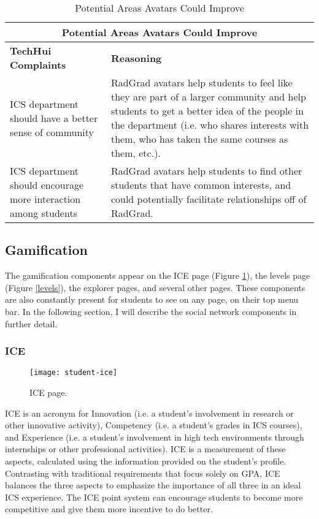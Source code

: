 \begin{table}[htbp!]
\centering
\begin{tabular}{  |p{4cm}|p{12cm}| } 
\hline
 \multicolumn{2}{|c|}{Potential Areas Avatars Could Improve}\\
  \hline
 \textbf{TechHui Complaints} & \textbf{Reasoning} \\ 
  \hline
ICS department should have a better sense of community & RadGrad avatars help students to feel like they are part of a larger community and help students to get a better idea of the people in the department (i.e. who shares interests with them, who has taken the same courses as them, etc.). \\
\hline
ICS department should encourage more interaction among students & RadGrad avatars help students to find other students that have common interests, and could potentially facilitate relationships off of RadGrad.\\
\hline
\end{tabular}
 \caption{Potential Areas Avatars Could Improve}
\end{table}


\subsection{Gamification}

The gamification components appear on the ICE page (Figure \ref{ice}), the levels page (Figure \ref{levels}), the explorer pages, and several other pages. These components are also constantly present for students to see on any page, on their top menu bar. In the following section, I will describe the social network components in further detail. 
\subsubsection{ICE}
\begin{figure}[htbp!]
\centering
\texttt{[image: student-ice]}
\caption{ICE page.}
\label{ice}
\end{figure}
ICE is an acronym for Innovation (i.e. a student's involvement in research or other innovative activity), Competency (i.e. a student's grades in ICS courses), and Experience (i.e. a student's involvement in high tech environments through internships or other professional activities). ICE is a measurement of these aspects, calculated using the information provided on the student's profile. Contrasting with traditional requirements that focus solely on GPA, ICE balances the three aspects to emphasize the importance of all three in an ideal ICS experience. The ICE point system can encourage students to become more competitive and give them more incentive to do better.

